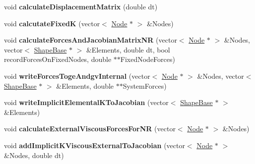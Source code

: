 \begin{DoxyCompactItemize}
\item 
\hypertarget{classNewtonRaphsonSolver_aa0ce333a40397fd113f9b9fc47bcb6ca}{}void {\bfseries calculate\+Displacement\+Matrix} (double dt)\label{classNewtonRaphsonSolver_aa0ce333a40397fd113f9b9fc47bcb6ca}

\item 
\hypertarget{classNewtonRaphsonSolver_a6301430b351e65b2bcf8b0d1dc1ef903}{}void {\bfseries calcutate\+Fixed\+K} (vector$<$ \hyperlink{classNode}{Node} $\ast$ $>$ \&Nodes)\label{classNewtonRaphsonSolver_a6301430b351e65b2bcf8b0d1dc1ef903}

\item 
\hypertarget{classNewtonRaphsonSolver_aa0752205679f10e145b042089ecdbd77}{}void {\bfseries calculate\+Forces\+And\+Jacobian\+Matrix\+N\+R} (vector$<$ \hyperlink{classNode}{Node} $\ast$ $>$ \&Nodes, vector$<$ \hyperlink{classShapeBase}{Shape\+Base} $\ast$ $>$ \&Elements, double dt, bool record\+Forces\+On\+Fixed\+Nodes, double $\ast$$\ast$Fixed\+Node\+Forces)\label{classNewtonRaphsonSolver_aa0752205679f10e145b042089ecdbd77}

\item 
\hypertarget{classNewtonRaphsonSolver_aab9e4e32675e111fcb7b651bc5252404}{}void {\bfseries write\+Forces\+Toge\+Andgv\+Internal} (vector$<$ \hyperlink{classNode}{Node} $\ast$ $>$ \&Nodes, vector$<$ \hyperlink{classShapeBase}{Shape\+Base} $\ast$ $>$ \&Elements, double $\ast$$\ast$System\+Forces)\label{classNewtonRaphsonSolver_aab9e4e32675e111fcb7b651bc5252404}

\item 
\hypertarget{classNewtonRaphsonSolver_aa56100b5f87948b19dc9f1e1ac4086c2}{}void {\bfseries write\+Implicit\+Elemental\+K\+To\+Jacobian} (vector$<$ \hyperlink{classShapeBase}{Shape\+Base} $\ast$ $>$ \&Elements)\label{classNewtonRaphsonSolver_aa56100b5f87948b19dc9f1e1ac4086c2}

\item 
\hypertarget{classNewtonRaphsonSolver_ad84f9e93e68998691a3c235d4ca3f895}{}void {\bfseries calculate\+External\+Viscous\+Forces\+For\+N\+R} (vector$<$ \hyperlink{classNode}{Node} $\ast$ $>$ \&Nodes)\label{classNewtonRaphsonSolver_ad84f9e93e68998691a3c235d4ca3f895}

\item 
\hypertarget{classNewtonRaphsonSolver_a7a6c2da404281b1cbd3d43fc0a8a0baa}{}void {\bfseries add\+Implicit\+K\+Viscous\+External\+To\+Jacobian} (vector$<$ \hyperlink{classNode}{Node} $\ast$ $>$ \&Nodes, double dt)\label{classNewtonRaphsonSolver_a7a6c2da404281b1cbd3d43fc0a8a0baa}


\end{DoxyCompactItemize}
